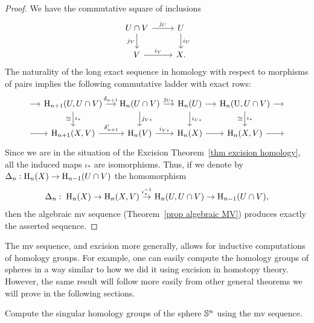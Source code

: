 \begin{proof}
    We have the commutative square of inclusions
    \[\begin{tikzcd}
        U\cap V\arrow[r,"j_U"]\arrow[d,"j_V",swap] & U\arrow[d,"i_U"]\\
        V\arrow[r,"i_V"]& X.
    \end{tikzcd}\]
    The naturality of the long exact sequence in homology with respect to morphisms of pairs implies the following commutative ladder with exact rows:
    \[\begin{tikzcd}[column sep=small]
        ~\arrow[r]& \rmH_{n+1}(U,U\cap V)\arrow[r,"\delta_{n+1}"]\arrow[d,"\iota_\ast","\cong"'] & \rmH_n(U\cap V) \arrow[r,"j_{U\ast}"]\arrow[d,"j_{V\ast}"] & \rmH_n(U)\arrow[d,"i_{U\ast}"]\arrow[r] & \rmH_{n}(\U,U\cap V)\arrow[d,"\iota_\ast","\cong"']\arrow[r]&~ \\
       ~\arrow[r] & \rmH_{n+1}(X,V)\arrow[r,"\delta_{n+1}'"] & \rmH_n(V)\arrow[r,"i_{V\ast}"] &\rmH_n(X) \arrow[r] &\rmH_{n}(X,V)\arrow[r]&~
    \end{tikzcd}\]
    Since we are in the situation of the Excision Theorem~\ref{thm excision homology}, all the induced maps $\iota_\ast$ are isomorphisms. Thus, if we denote by $\Delta_n:\mathrm{H}_n(X)\to \mathrm{H}_{n-1}(U\cap V)$ the homomorphism
    \[\Delta_n:\;\mathrm{H}_n(X)\to \mathrm{H}_n(X,V)\overset{\iota_\ast^{-1}}{\to }\mathrm{H}_n(U,U\cap V)\to \mathrm{H}_{n-1}(U\cap V),\]
    then the algebraic \gls{mv} sequence (Theorem~\ref{prop algebraic MV}) produces exactly the asserted sequence.
\end{proof}

The \gls{mv} sequence, and excision more generally, allows for inductive computations of homology groups. For example, one can easily compute the homology groups of spheres in a way similar to how we did it using excision in homotopy theory. However, the same result will follow more easily from other general theorems we will prove in the following sections.

\begin{xca}
    Compute the singular homology groups of the sphere $\mathbb{S}^n$ using the \gls{mv} sequence.
\end{xca}

